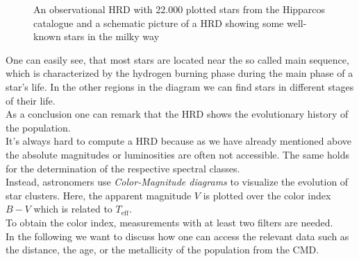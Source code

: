\begin{figure}[H]
\caption[Hertzsprung-Russell diagram]{An observational HRD with 22.000 plotted stars from the Hipparcos catalogue and a schematic picture of a HRD showing some well-known stars in the milky way\footnotemark}
\end{figure}
One can easily see, that most stars are located near the so called main sequence, which is characterized by the hydrogen burning phase during the main phase of a star's life. In the other regions in the diagram we can find stars in different stages of their life. \\
As a conclusion one can remark that the HRD shows the evolutionary history of the population. \\
It's always hard to compute a HRD because as we have already mentioned above the absolute magnitudes or luminosities are often not accessible. The same holds for the determination of the respective spectral classes. \\
Instead, astronomers use \textit{Color-Magnitude diagrams} to visualize the evolution of star clusters. Here, the apparent magnitude $V$ is plotted over the color index $B-V$ which is related to $T_{\text{eff}}$. \\
To obtain the color index, measurements with at least two filters are needed. \\
In the following we want to discuss how one can access the relevant data such as the distance, the age, or the metallicity of the population from the CMD.
